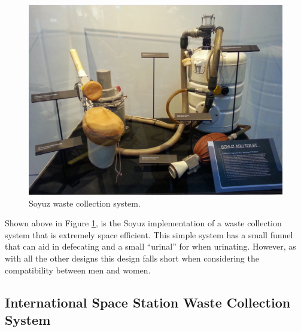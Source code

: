     \begin{figure}[h]
        \centering
        \includegraphics[width = \linewidth]{figs/soyuz_space_toilet.jpg}
        \caption[Soyuz Waste Collection System]{Soyuz waste collection system.}
        \label{fig:soyuz_space_toilet}
    \end{figure}

    Shown above in Figure \ref{fig:soyuz_space_toilet}, is the Soyuz implementation of a waste collection system that is extremely space efficient. This simple system has a small funnel that can aid in defecating and a small ``urinal'' for when urinating. However, as with all the other designs this design falls short when considering the compatibility between men and women.\cite{ref:soyuz_toilet}

    \pagebreak
    \subsection{International Space Station Waste Collection System}

